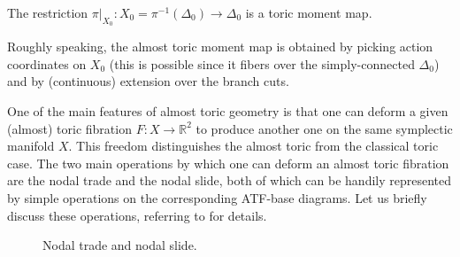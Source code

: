 \documentclass[12pt,a4paper,abstract=true,draft]{scrartcl}
\begin{document}
\begin{proposition}
    \label{thm:toricmomentmap}
    The restriction $\pi\vert_{X_0} \colon X_0 = \pi^{-1}(\Delta_0) \rightarrow \Delta_0$ is a toric moment map.
\end{proposition}

Roughly speaking, the almost toric moment map is obtained by picking action coordinates on $X_0$ (this is possible since it fibers over the simply-connected $\Delta_0$) and by (continuous) extension over the branch cuts.

One of the main features of almost toric geometry is that one can deform a given (almost) toric fibration $F \colon X \rightarrow \mathbb{R}^2$ to produce another one on the same symplectic manifold $X$.
This freedom distinguishes the almost toric from the classical toric case.
The two main operations by which one can deform an almost toric fibration are the nodal trade and the nodal slide, both of which can be handily represented by simple operations on the corresponding ATF-base diagrams.
Let us briefly discuss these operations, referring to \cite[Sections 8.2-8.3]{evans2021atfs} for details.

\begin{figure}
  \centering
  \caption{Nodal trade and nodal slide.}
  \label{fig:nodal_trade_and_slide}
\end{figure}
\end{document}
